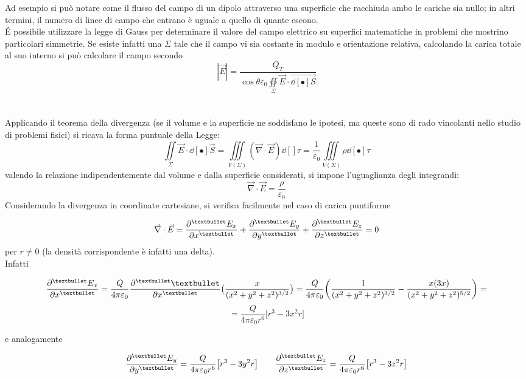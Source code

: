 
Ad esempio si può notare come il flusso del campo di un dipolo attraverso una superficie che racchiuda ambo le cariche sia nullo; in altri termini, il numero di linee di campo che entrano è uguale a quello di quante escono.
\\\'E possibile utilizzare la legge di Gauss per determinare il valore del campo elettrico su superfici matematiche in problemi che mostrino particolari simmetrie. Se esiste infatti una $\Sigma$ tale che il campo vi sia costante in modulo e orientazione relativa, calcolando la carica totale al suo interno si può calcolare il campo secondo
\[|\vec{E}| = \frac{Q_T}{\cos \theta \varepsilon_0 \oiint\limits_\Sigma \vec{E} \cdot \vec{\dd[•]{S}}}\]
\\~\\
Applicando il teorema della divergenza (se il volume e la superficie ne soddisfano le ipotesi, ma queste sono di rado vincolanti nello studio di problemi fisici) si ricava la forma puntuale della Legge:
\[\iint\limits_\Sigma \vec{E} \cdot \dd[•]{\vec{S}} = \iiint\limits_{V(\Sigma)} (\vec{\nabla} \cdot \vec{E}) \dd[]{\tau} = \frac{1}{\varepsilon_0} \iiint\limits_{V(\Sigma)} \rho \dd[•]{\tau}\]
valendo la relazione indipendentemente dal volume e dalla superficie considerati, si impone l'uguaglianza degli integrandi:
\[\vec{\nabla} \cdot \vec{E} = \frac{\rho}{\varepsilon_0}\]
Considerando la divergenza in coordinate cartesiane, si verifica facilmente nel caso di carica puntiforme 

\[\vec{\nabla} \cdot \vec{E} = \pdv[•]{E_x}{x} + \pdv[•]{E_y}{y} + \pdv[•]{E_z}{z} = 0\]
per $r \neq 0$ (la densità corrispondente è infatti una delta).
\\Infatti

\[\pdv[•]{E_x}{x} = \frac{Q}{4 \pi \varepsilon_0} \pdv[•]{•}{x} \big(\frac{x}{(x^2 + y^2 + z^2)^{3/2}}\big) = \frac{Q}{4 \pi \varepsilon_0} \bigg(\frac{1}{(x^2 + y^2 + z^2)^{3/2}} - \frac{x (3 x)}{(x^2 + y^2 + z^2)^{5/2}}\bigg) = \]
\[= \frac{Q}{4 \pi \varepsilon_0 r^6} \big[r^3 - 3 x^2 r\big]\]

e analogamente

\[\pdv[•]{E_y}{y} = \frac{Q}{4 \pi \varepsilon_0 r^6} \big[r^3 - 3 y^2 r\big] \qquad \pdv[•]{E_z}{z} = \frac{Q}{4 \pi \varepsilon_0 r^6} \big[r^3 - 3 z^2 r\big]\]

